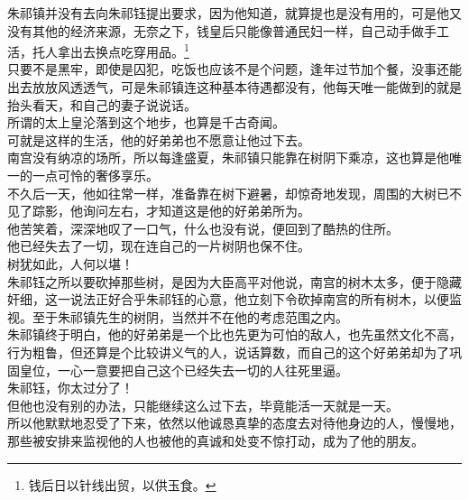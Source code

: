 \begin{multicols}{\theparacolNo}
朱祁镇并没有去向朱祁钰提出要求，因为他知道，就算提也是没有用的，可是他又没有其他的经济来源，无奈之下，钱皇后只能像普通民妇一样，自己动手做手工活，托人拿出去换点吃穿用品。\footnote{钱后日以针线出贸，以供玉食。}\\

只要不是黑牢，即使是囚犯，吃饭也应该不是个问题，逢年过节加个餐，没事还能出去放放风透透气，可是朱祁镇连这种基本待遇都没有，他每天唯一能做到的就是抬头看天，和自己的妻子说说话。\\

所谓的太上皇沦落到这个地步，也算是千古奇闻。\\

可就是这样的生活，他的好弟弟也不愿意让他过下去。\\

南宫没有纳凉的场所，所以每逢盛夏，朱祁镇只能靠在树阴下乘凉，这也算是他唯一的一点可怜的奢侈享乐。\\

不久后一天，他如往常一样，准备靠在树下避暑，却惊奇地发现，周围的大树已不见了踪影，他询问左右，才知道这是他的好弟弟所为。\\

他苦笑着，深深地叹了一口气，什么也没有说，便回到了酷热的住所。\\

他已经失去了一切，现在连自己的一片树阴也保不住。\\

树犹如此，人何以堪！\\

朱祁钰之所以要砍掉那些树，是因为大臣高平对他说，南宫的树木太多，便于隐藏奸细，这一说法正好合乎朱祁钰的心意，他立刻下令砍掉南宫的所有树木，以便监视。至于朱祁镇先生的树阴，当然并不在他的考虑范围之内。\\

朱祁镇终于明白，他的好弟弟是一个比也先更为可怕的敌人，也先虽然文化不高，行为粗鲁，但还算是个比较讲义气的人，说话算数，而自己的这个好弟弟却为了巩固皇位，一心一意要把自己这个已经失去一切的人往死里逼。\\

朱祁钰，你太过分了！\\

但他也没有别的办法，只能继续这么过下去，毕竟能活一天就是一天。\\

所以他默默地忍受了下来，依然以他诚恳真挚的态度去对待他身边的人，慢慢地，那些被安排来监视他的人也被他的真诚和处变不惊打动，成为了他的朋友。\\


\end{multicols}
